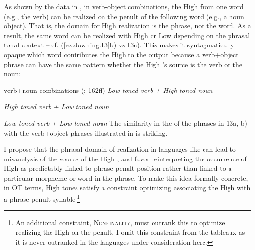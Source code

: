 \documentclass[output=paper
,newtxmath
,modfonts
,nonflat]{langsci/langscibook}
\begin{document}
As shown by the data in , in  verb-object combinations, the High  from one word (e.g., the verb) can be realized on the penult of the following word (e.g., a noun object). That is, the domain for High  realization is the phrase, not the word. As a result, the same word can be realized with High  or Low  depending on the phrasal tonal context – cf. (\ref{ex:downing:13}b) vs 13c). This makes it syntagmatically opaque which word contributes the High  to the output because a verb+object phrase can have the same  pattern whether the High ’s source is the verb or the noun:

\begin{comment}
\ea%
    \label{bkm:Ref99433084}
    \langinfo{lg}{fam}{src}\\
    \gll \\  
        \\
    \glt
    \z
\end{comment}
\ea\label{ex:downing:13}  verb+noun combinations (\citealt{Kisseberth1984}: 162ff)
\ea\label{ex:downing:13a} \textit{Low toned verb + High toned noun}
\sn
{}
\sn
{}
\sn
{}

\ex\label{ex:downing:13b}  \textit{High toned verb + Low toned noun}
\sn
{}
\sn
{}
\sn
{}
\sn
{}

\ex\label{ex:downing:13c}\textit{Low toned verb + Low toned noun}
\sn
{}
\sn
{}
\z
\z
The similarity in the  of the  phrases in 13a, b) with the  verb+object phrases illustrated in  is striking.

I propose that the phrasal domain of  realization in languages like  can lead to misanalysis of the source of the High , and favor reinterpreting the occurrence of High  as predictably linked to phrase penult position rather than linked to a particular morpheme or word in the phrase. To make this idea formally concrete, in OT terms,  High tones satisfy a constraint optimizing associating the High  with a phrase penult syllable:\footnote{An additional constraint, \textsc{Nonfinality,} must outrank this  to optimize realizing the High  on the penult. I omit this constraint from the tableaux as it is never outranked in the languages under consideration here.}
\end{document}
